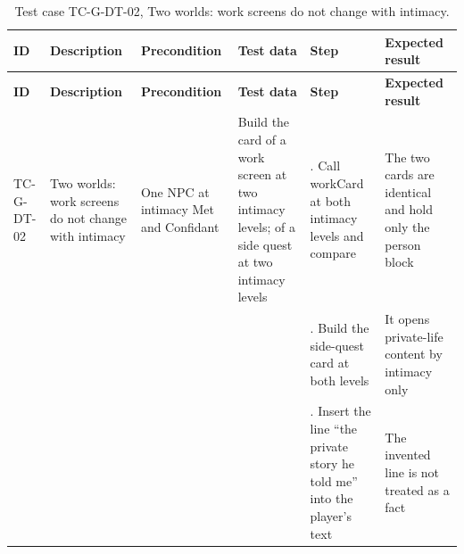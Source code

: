 {\footnotesize{}\renewcommand{\arraystretch}{1.1}
\begin{longtable}{|>{\raggedright\arraybackslash}p{}|>{\raggedright\arraybackslash}p{}|>{\raggedright\arraybackslash}p{}|>{\raggedright\arraybackslash}p{}|>{\raggedright\arraybackslash}p{}|>{\raggedright\arraybackslash}p{}|}
\caption{Test case TC-G-DT-02, Two worlds: work screens do not change with intimacy.} \\
\hline
\textbf{ID} & \textbf{Description} & \textbf{Precondition} & \textbf{Test data} & \textbf{Step} & \textbf{Expected result} \\ \hline
\endfirsthead
\hline
\textbf{ID} & \textbf{Description} & \textbf{Precondition} & \textbf{Test data} & \textbf{Step} & \textbf{Expected result} \\ \hline
\endhead
TC-G-DT-02 & Two worlds: work screens do not change with intimacy & One NPC at intimacy Met and Confidant & Build the card of a work screen at two intimacy levels; of a side quest at two intimacy levels & 1. Call workCard at both intimacy levels and compare & The two cards are identical and hold only the person block \\ \cline{5-6}
 &  &  &  & 2. Build the side-quest card at both levels & It opens private-\allowbreak{}life content by intimacy only \\ \cline{5-6}
 &  &  &  & 3. Insert the line ``the private story he told me'' into the player's text & The invented line is not treated as a fact \\ \hline
\end{longtable}
}

